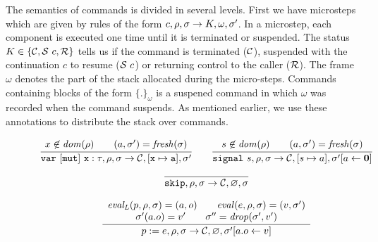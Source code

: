 The semantics of commands is divided in several levels. First we have microsteps which are given
by rules of the form $c,\rho,\sigma \rightarrow K, \omega,\heap'$. In a microstep, each component
is executed one time until it is terminated or suspended.
The status $K \in\{\continue, \suspend~c, \ret\}$ tells us if the command is terminated ($\continue$), suspended
with the continuation $c$ to resume ($\suspend~c$) or returning control to the caller ($\ret$).
The frame $\omega$ denotes the part of the stack allocated during the micro-steps. Commands containing blocks
of the form $\{.\}_\omega$ is a suspened command in which $\omega$ was recorded when the command suspends.
As mentioned earlier, we use these annotations to distribute the stack over commands.
\begin{figure}
  $$
    \begin{array}{c}
      \cfrac{
        x \not \in \dom (\rho) \qquad 
        (\address,\heap') = {\mathit{fresh}}(\heap)
      }{
        \variable~[mut]~x:\tau, \env,\heap \rightarrow
        \continue, [x\mapsto \address], \heap'
      }
      \qquad
      \cfrac{
        s \not \in \dom(\rho) \qquad 
        (\address,\heap') = {\mathit{fresh}}(\heap)
      }{
        \dsignal~\sig, \env, \heap\rightarrow
        \continue, [\sig \mapsto \address], \heap'[\address \leftarrow \absent]
      }
      \\
      \cfrac{}{\skipp,\env ,\sigma \rightarrow \continue, \varnothing,\sigma}
      \\\\
      \cfrac{
        \begin{array}{c}
          \evalLeft{p}{\env}{\heap} = (\address,o) \qquad
          \eval{e}{\env}{\heap} = (v, \heap')\\
          \heap'(a.o) = v' \qquad \heap'' = {\mathit{drop}}(\heap',v')
        \end{array}
      }{
        p := e, \env,\heap \rightarrow
        \continue, \varnothing,\heap'[\address.o \leftarrow v]
      }

\end{array}$$
\end{figure}
